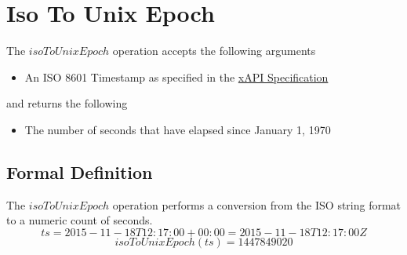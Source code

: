 \documentclass[../../main.tex]{subfiles}
\begin{document}
\section{Iso To Unix Epoch}

The $isoToUnixEpoch$ operation accepts the following arguments

\begin{itemize}
\item An ISO 8601 Timestamp as specified in the \href{https://github.com/adlnet/xAPI-Spec/blob/master/xAPI-Data.md#timestamps}{xAPI Specification}
\end{itemize}
and returns the following
\begin{itemize}
\item The number of seconds that have elapsed since January 1, 1970
\end{itemize}

\subsection{Formal Definition}

The $isoToUnixEpoch$ operation performs a conversion from the ISO string format to a numeric count of seconds.
$$ts = 2015-11-18T12:17:00+00:00 = 2015-11-18T12:17:00Z$$
$$isoToUnixEpoch(ts) =  1447849020$$
\end{document}

